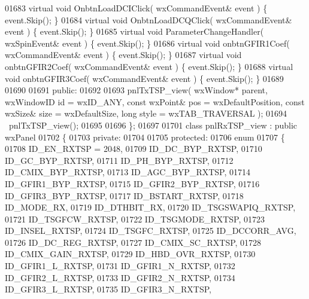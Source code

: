 \begin{DoxyCode}
01683         \textcolor{keyword}{virtual} \textcolor{keywordtype}{void} OnbtnLoadDCIClick( wxCommandEvent& event ) \{ \textcolor{keyword}{event}.Skip(); \}
01684         \textcolor{keyword}{virtual} \textcolor{keywordtype}{void} OnbtnLoadDCQClick( wxCommandEvent& event ) \{ \textcolor{keyword}{event}.Skip(); \}
01685         \textcolor{keyword}{virtual} \textcolor{keywordtype}{void} ParameterChangeHandler( wxSpinEvent& event ) \{ \textcolor{keyword}{event}.Skip(); \}
01686         \textcolor{keyword}{virtual} \textcolor{keywordtype}{void} onbtnGFIR1Coef( wxCommandEvent& event ) \{ \textcolor{keyword}{event}.Skip(); \}
01687         \textcolor{keyword}{virtual} \textcolor{keywordtype}{void} onbtnGFIR2Coef( wxCommandEvent& event ) \{ \textcolor{keyword}{event}.Skip(); \}
01688         \textcolor{keyword}{virtual} \textcolor{keywordtype}{void} onbtnGFIR3Coef( wxCommandEvent& event ) \{ \textcolor{keyword}{event}.Skip(); \}
01689         
01690     
01691     \textcolor{keyword}{public}:
01692         
01693         pnlTxTSP_view( wxWindow* parent, wxWindowID \textcolor{keywordtype}{id} = wxID\_ANY, \textcolor{keyword}{const} wxPoint& pos = wxDefaultPosition, \textcolor{keyword}{
      const} wxSize& size = wxDefaultSize, \textcolor{keywordtype}{long} style = wxTAB\_TRAVERSAL ); 
01694         ~pnlTxTSP_view();
01695     
01696 \};
01697 
01701 \textcolor{keyword}{class }pnlRxTSP_view : \textcolor{keyword}{public} wxPanel 
01702 \{
01703     \textcolor{keyword}{private}:
01704     
01705     \textcolor{keyword}{protected}:
01706         \textcolor{keyword}{enum}
01707         \{
01708             ID\_EN\_RXTSP = 2048,
01709             ID_DC_BYP_RXTSP,
01710             ID_GC_BYP_RXTSP,
01711             ID_PH_BYP_RXTSP,
01712             ID_CMIX_BYP_RXTSP,
01713             ID_AGC_BYP_RXTSP,
01714             ID_GFIR1_BYP_RXTSP,
01715             ID_GFIR2_BYP_RXTSP,
01716             ID_GFIR3_BYP_RXTSP,
01717             ID_BSTART_RXTSP,
01718             ID_MODE_RX,
01719             ID_DTHBIT_RX,
01720             ID_TSGSWAPIQ_RXTSP,
01721             ID_TSGFCW_RXTSP,
01722             ID_TSGMODE_RXTSP,
01723             ID_INSEL_RXTSP,
01724             ID_TSGFC_RXTSP,
01725             ID_DCCORR_AVG,
01726             ID_DC_REG_RXTSP,
01727             ID_CMIX_SC_RXTSP,
01728             ID_CMIX_GAIN_RXTSP,
01729             ID_HBD_OVR_RXTSP,
01730             ID_GFIR1_L_RXTSP,
01731             ID_GFIR1_N_RXTSP,
01732             ID_GFIR2_L_RXTSP,
01733             ID_GFIR2_N_RXTSP,
01734             ID_GFIR3_L_RXTSP,
01735             ID_GFIR3_N_RXTSP,

\end{DoxyCode}
